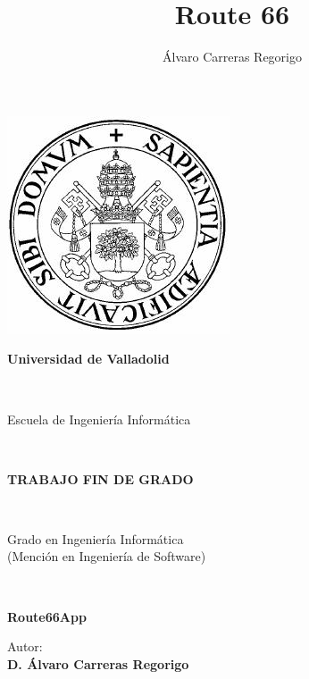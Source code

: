 \documentclass[11pt,a4paper,twoside]{article}
\author{Álvaro Carreras Regorigo}
\title{Route 66}
\begin{document}
\begin{titlepage}
\begin{center}
\includegraphics[scale=0.5]{images/logoUVa}\\\vspace{1cm}
\begin{LARGE}\textbf{Universidad de Valladolid}\end{LARGE}\\
\vspace{2cm}
\begin{Huge}Escuela de Ingeniería Informática\end{Huge} \\\vspace{0.5cm}
\begin{large}\textbf{TRABAJO FIN DE GRADO}\end{large}\\ \vspace{2.5cm}
\begin{Large}Grado en Ingeniería Informática \\ (Mención en Ingeniería de Software)\end{Large}\\ \vspace{4cm}
\begin{Huge}\textbf{Route66App}\end{Huge}
\end{center}\vspace{6cm}
\begin{flushright}
\begin{large}Autor: \\\textbf{D. Álvaro Carreras Regorigo}\end{large}
\end{flushright}
\end{titlepage}




\clearpage

\lipsum[1-160]
\end{document}
